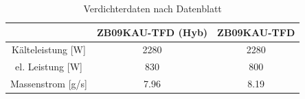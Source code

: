 \begin{table}[h!]
\centering
\caption{Verdichterdaten nach Datenblatt}
\label{tab:Verdichterdatenblatt}
\begin{tabular}{|ccc|}
\hline
                                            & ZB09KAU-TFD (Hyb)         & ZB09KAU-TFD \\ \hline
\multicolumn{1}{|c|}{Kälteleistung {[}W{]}} & \multicolumn{1}{c|}{2280} & 2280        \\
\multicolumn{1}{|c|}{el. Leistung {[}W{]}}  & \multicolumn{1}{c|}{830}  & 800         \\
\multicolumn{1}{|c|}{Massenstrom {[}g/s{]}} & \multicolumn{1}{c|}{7.96} & 8.19        \\ \hline
\end{tabular}
\end{table}


